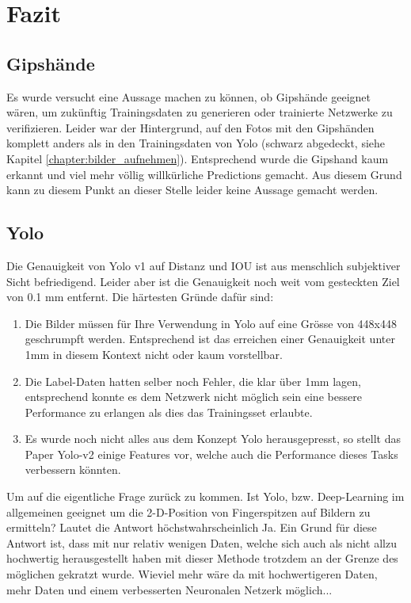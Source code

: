 \newpage
\section{Fazit} 
\subsection{Gipshände}
Es wurde versucht eine Aussage machen zu können, ob Gipshände geeignet wären, um zukünftig Trainingsdaten zu generieren oder trainierte Netzwerke zu verifizieren.
Leider war der Hintergrund, auf den Fotos mit den Gipshänden komplett anders als in den Trainingsdaten von Yolo (schwarz abgedeckt, siehe Kapitel \ref{chapter:bilder_aufnehmen}).
Entsprechend wurde die Gipshand kaum erkannt und viel mehr völlig willkürliche Predictions gemacht.
Aus diesem Grund kann zu diesem Punkt an dieser Stelle leider keine Aussage gemacht werden.

\subsection{Yolo}
Die Genauigkeit von Yolo v1 auf Distanz und IOU ist aus menschlich subjektiver Sicht befriedigend. 
Leider aber ist die Genauigkeit noch weit vom gesteckten Ziel von 0.1 mm entfernt.
Die härtesten Gründe dafür sind:
\begin{enumerate}
\item Die Bilder müssen für Ihre Verwendung in Yolo auf eine Grösse von 448x448 geschrumpft werden. Entsprechend ist  das erreichen einer Genauigkeit unter 1mm in diesem Kontext nicht oder kaum vorstellbar.
\item Die Label-Daten hatten selber noch Fehler, die klar über 1mm lagen, entsprechend konnte es dem Netzwerk nicht möglich sein eine bessere Performance zu erlangen als dies das Trainingsset erlaubte.
\item Es wurde noch nicht alles aus dem Konzept Yolo herausgepresst, so stellt das Paper Yolo-v2 \cite{yolo2} einige Features vor, welche auch die Performance dieses Tasks verbessern könnten.
\end{enumerate}

Um auf die eigentliche Frage zurück zu kommen.
Ist Yolo, bzw. Deep-Learning im allgemeinen geeignet um die 2-D-Position von Fingerspitzen auf Bildern zu ermitteln?
Lautet die Antwort höchstwahrscheinlich Ja.
Ein Grund für diese Antwort ist, dass mit nur relativ wenigen Daten, welche sich auch als nicht allzu hochwertig herausgestellt haben mit dieser Methode trotzdem an der Grenze des möglichen gekratzt wurde.
Wieviel mehr wäre da mit hochwertigeren Daten, mehr Daten und einem verbesserten Neuronalen Netzerk möglich...


